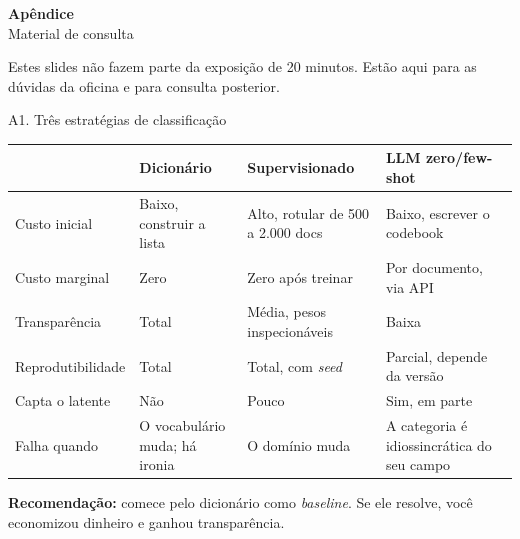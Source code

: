 \documentclass[11pt,aspectratio=169]{beamer}
\begin{document}

\appendix

\begin{frame}[plain]
\centering
\vspace{1.6cm}
{\Huge \textbf{Apêndice}}\\[0.7cm]
{\large Material de consulta}\\[0.5cm]
\small
\parbox{0.75\textwidth}{\centering
Estes slides não fazem parte da exposição de 20 minutos. Estão aqui para as
dúvidas da oficina e para consulta posterior.}
\end{frame}

\begin{frame}{A1. Três estratégias de classificação}
\begin{table}
\scriptsize
\begin{tabular}{p{2.3cm}p{3.1cm}p{3.2cm}p{3.4cm}}
\toprule
& \textbf{Dicionário} & \textbf{Supervisionado} & \textbf{LLM zero/few-shot} \\
\midrule
Custo inicial & Baixo, construir a lista & Alto, rotular de 500 a 2.000 docs &
Baixo, escrever o codebook \\
\addlinespace
Custo marginal & Zero & Zero após treinar & Por documento, via API \\
\addlinespace
Transparência & Total & Média, pesos inspecionáveis & Baixa \\
\addlinespace
Reprodutibilidade & Total & Total, com \emph{seed} & Parcial, depende da versão \\
\addlinespace
Capta o latente & Não & Pouco & Sim, em parte \\
\addlinespace
Falha quando & O vocabulário muda; há ironia & O domínio muda &
A categoria é idiossincrática do seu campo \\
\bottomrule
\end{tabular}
\end{table}
\vspace{0.1cm}
\footnotesize \textbf{Recomendação:} comece pelo dicionário como \emph{baseline}.
Se ele resolve, você economizou dinheiro e ganhou transparência.
\end{frame}
\end{document}
